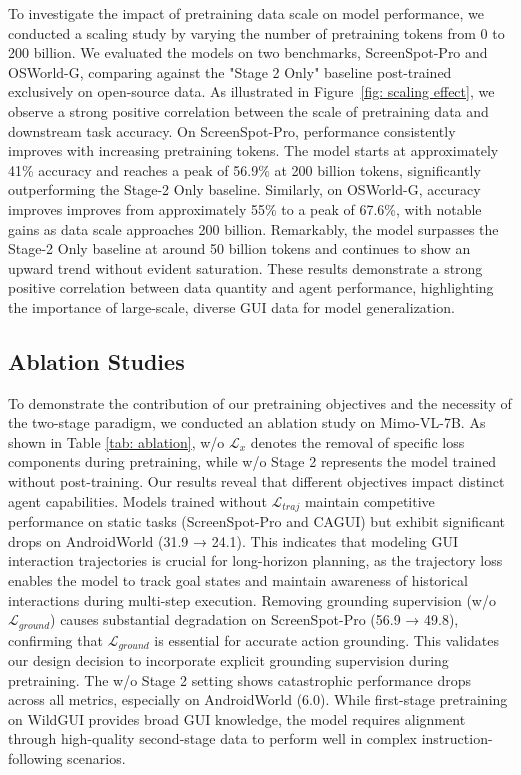 \documentclass{llmxive}
\begin{document}
To investigate the impact of pretraining data scale on model performance, we conducted a scaling study by varying the number of pretraining tokens from 0 to 200 billion. We evaluated the models on two benchmarks, ScreenSpot-Pro and OSWorld-G, comparing against the "Stage 2 Only" baseline post-trained exclusively on open-source data.
As illustrated in Figure~\ref{fig: scaling effect}, we observe a strong positive correlation between the scale of pretraining data and downstream task accuracy. On ScreenSpot-Pro, performance consistently improves with increasing pretraining tokens. The model starts at approximately 41\% accuracy and reaches a peak of 56.9\% at 200 billion tokens, significantly outperforming the Stage-2 Only baseline.
Similarly, on OSWorld-G, accuracy improves improves from approximately 55\% to a peak of 67.6\%, with notable gains as data scale approaches 200 billion. Remarkably, the model surpasses the Stage-2 Only baseline at around 50 billion tokens and continues to show an upward trend without evident saturation. These results demonstrate a strong positive correlation between data quantity and agent performance, highlighting the importance of large-scale, diverse GUI data for model generalization.

\subsection{Ablation Studies}

To demonstrate the contribution of our pretraining objectives and the necessity of the two-stage paradigm, we conducted an ablation study on Mimo-VL-7B. As shown in Table \ref{tab: ablation}, w/o $\mathcal{L}_{x}$ denotes the removal of specific loss components during pretraining, while w/o Stage 2 represents the model trained without post-training. 
Our results reveal that different objectives impact distinct agent capabilities. Models trained without $\mathcal{L}_{traj}$ maintain competitive performance on static tasks (ScreenSpot-Pro and CAGUI) but exhibit significant drops on AndroidWorld (31.9 → 24.1). This indicates that modeling GUI interaction trajectories is crucial for long-horizon planning, as the trajectory loss enables the model to track goal states and maintain awareness of historical interactions during multi-step execution.
Removing grounding supervision (w/o $\mathcal{L}_{ground}$) causes substantial degradation on ScreenSpot-Pro (56.9 → 49.8), confirming that $\mathcal{L}_{ground}$ is essential for accurate action grounding. This validates our design decision to incorporate explicit grounding supervision during pretraining.
The w/o Stage 2 setting shows catastrophic performance drops across all metrics, especially on AndroidWorld (6.0). While first-stage pretraining on WildGUI provides broad GUI knowledge, the model requires alignment through high-quality second-stage data to perform well in complex instruction-following scenarios. 
\end{document}
